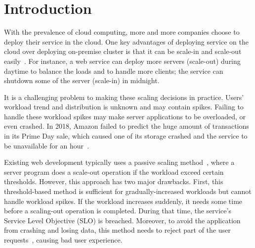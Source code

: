 \section{Introduction}

With the prevalence of cloud computing, more and more companies choose to deploy
their service in the cloud. One key advantages of deploying service on the cloud
over deploying on-premise cluster is that it can be scale-in and scale-out
easily~\cite{cloud:scale}. For instance, a web service can deploy more servers
(scale-out) during daytime to balance the loads and to handle more clients; the
service can shutdown some of the server (scale-in) in midnight.  

It is a challenging problem to making these scaling decisions in
practice. Users' workload trend and distribution is unknown and may contain 
spikes. Failing to handle these workload spikes may make server applications 
to be overloaded, or even crashed. In 2018, Amazon failed to predict the
huge amount of transactions in its Prime Day sale, which caused one of its 
storage crashed and the service to be unavailable for an hour~\cite{amazon:down}. 

Existing web development typically uses a passive scaling
method~\cite{mao2010cloud, aws:scale, azure:scale}, where a server program does
a scale-out operation if the workload exceed certain thresholds. However, this
approach has two major drawbacks. First, this threshold-based method is
sufficient for gradually-increased workloads but cannot handle workload spikes.
If the workload increases suddenly, it needs some time before a scaling-out
operation is completed. During that time, the service's Service Level Objective
(SLO) is breached. Moreover, to avoid the application from crashing and losing
data, this method needs to reject part of the user
requests~\cite{zhou2018overload}, causing bad user experience. 


